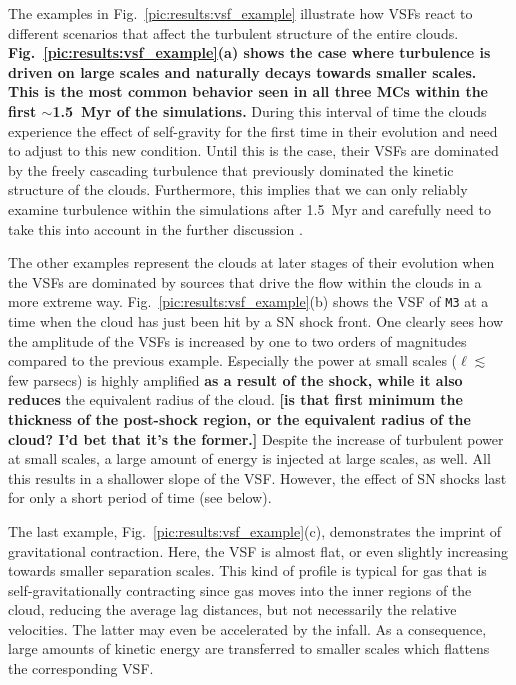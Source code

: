 The examples in Fig.~\ref{pic:results:vsf_example} illustrate how 
VSFs react to different scenarios that affect the turbulent structure of the entire clouds. 
\textbf{Fig.~\ref{pic:results:vsf_example}(a) shows the case where turbulence is driven on large scales and naturally decays towards smaller scales.
This is the most common behavior seen in all three MCs within the first $\sim$1.5~Myr of the simulations.}
During this interval of time the clouds experience the effect of self-gravity for the first time in their evolution and need to adjust to this new condition.
Until this is the case, their VSFs are dominated by the freely cascading turbulence that previously dominated the kinetic structure of the clouds.
Furthermore, this implies that we can only reliably examine turbulence within the simulations after 1.5~Myr and carefully need to take this into account in the further discussion \citep[see][]{IbanezMejia2017,Seifried2017b}.

The other examples represent the clouds at later stages of their evolution when the VSFs are dominated by sources that drive the 
   flow
within the clouds in a more extreme way.
Fig.~\ref{pic:results:vsf_example}(b) shows the VSF of \texttt{M3} at a time when the cloud has just been hit by a SN shock front. 
One clearly sees how the amplitude of the VSFs is increased by one to two orders of magnitudes compared to the previous example.
Especially the power 
    at small scales ($\ell \lesssim$ few parsecs) is highly amplified \textbf{as a result of the shock, while it also reduces} the equivalent radius of the cloud.
     {\bf [is that first minimum the thickness of the post-shock region, or the equivalent radius of the cloud?  I'd bet that it's the former.]}
Despite the increase of turbulent power at small scales, a large amount of energy is injected at large scales, as well.
All this results in a 
     shallower slope of the VSF.
However, the effect of SN shocks last for only a short period of time (see below).

The last example, Fig.~\ref{pic:results:vsf_example}(c), demonstrates the imprint of gravitational contraction.
Here, the VSF is almost flat, or even slightly increasing towards smaller separation scales. 
This kind of profile is typical for gas that is self-gravitationally contracting \citep{Boneberg2015,Burkhart2015} since gas moves into the inner regions of the cloud, reducing the average lag distances, but not necessarily the relative velocities.
The latter may even be accelerated by the infall.
As a consequence, large amounts of kinetic energy are transferred to smaller scales which flattens the corresponding VSF.

